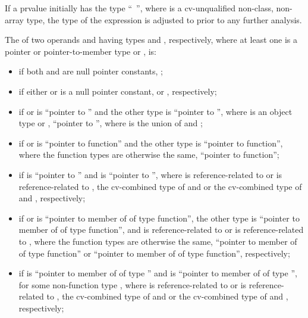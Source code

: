 \pnum
If a prvalue initially has the type ``\cv{}~'', where
 is a cv-unqualified non-class, non-array type, the type of
the expression is adjusted to  prior to any further analysis.

\pnum
{}%
The  of
two operands  and
 having types  and , respectively, where at least one is a
pointer or pointer-to-member type or
, is:
\begin{itemize}
\item
if both  and  are null pointer constants,
;

\item
if either  or  is a null pointer constant,  or ,
respectively;

\item
if  or  is ``pointer to  '' and the
other type is ``pointer to  '',
where  is an object type or ,
``pointer to  '',
where  is the union of  and ;

\item
if  or  is ``pointer to  function'' and the
other type is ``pointer to function'', where the function types are otherwise the same,
``pointer to function'';

\item
if  is ``pointer to  '' and  is ``pointer to
 '', where  is reference-related to  or  is
reference-related to , the cv-combined type
of  and  or the cv-combined type of  and ,
respectively;

\item
if  or  is
``pointer to member of  of type function'',
the other type is
``pointer to member of  of type  function'', and
 is reference-related to  or
 is reference-related to ,
where the function types are otherwise the same,
``pointer to member of  of type function'' or
``pointer to member of  of type function'', respectively;

\item
if  is
``pointer to member of  of type  '' and
 is
``pointer to member of  of type  '',
for some non-function type ,
where  is
reference-related to  or  is reference-related to
, the cv-combined type of  and  or the cv-combined type
of  and , respectively;


\end{itemize}
